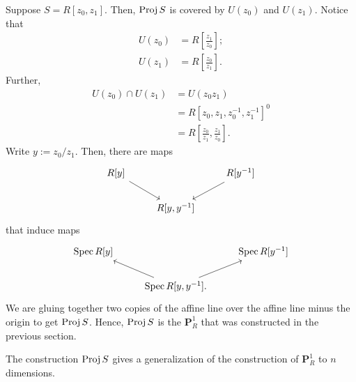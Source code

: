 \documentclass [11 pt, oneside] {article}
\begin{document}
\begin{example}[ ]\label{}\text{}
Suppose $S=R[z_0,z_1]$. Then, $\operatorname{Proj} S$ is covered by $U(z_0)$ and $U(z_1)$. Notice that
\begin{align*}
	U(z_0) &= R\left[ \frac{z_1}{z_0} \right] ;\\
	U(z_1)&= R \left[ \frac{z_0}{z_1} \right] .
\end{align*}
Further,
\begin{align*}
	U(z_0) \cap U(z_1) &= U(z_0z_1)\\
			     &= R [z_0,z_1,z_0^{-1},z_1^{-1}]^0\\
			     &= R \left[ \frac{z_0}{z_1},\frac{z_1}{z_0} \right] .
\end{align*}
Write $y:=z_0/z_1$. Then, there are maps
\[
\begin{tikzcd}
	R[y] \ar[dr] && R[y^{-1}] \ar[dl]\\
		     &R[y,y^{-1}]
\end{tikzcd}
\]
that induce maps
\[
\begin{tikzcd}
	\Spec R[y] &&\Spec R[y^{-1}]\\
		   &\Spec R[y,y^{-1}]\ar[ur]\ar[ul].
\end{tikzcd}
\]
We are gluing together two copies of the affine line over the affine line minus the origin to get $\operatorname{Proj} S$. Hence, $\operatorname{Proj} S $ is the $\mathbf{P}^1_{R}$ that was constructed in the previous section.

\end{example}

\begin{remark}
	The construction $\operatorname{Proj} S$ gives a generalization of the construction of $\mathbf{P}^1_{R}$ to $n$ dimensions.
\end{remark}
\end{document}
